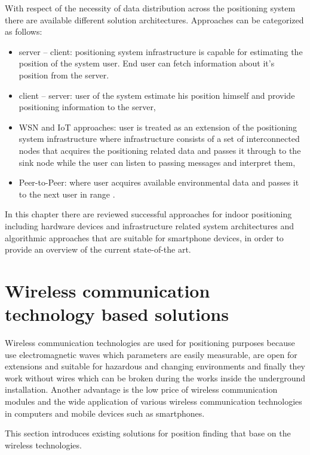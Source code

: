 \documentclass[../main.tex]{subfiles}
\begin{document}
With respect of the necessity of data distribution across the positioning system there are available different solution architectures. Approaches can be categorized as follows:
\begin{itemize}
	\item server -- client: positioning system infrastructure is capable for estimating the position of the system user. End user can fetch information about it's position from the server.
	\item client -- server: user of the system estimate his position himself and provide positioning information to the server,
	\item WSN and IoT approaches: user is treated as an extension of the positioning system infrastructure where infrastructure consists of a set of interconnected nodes that acquires the positioning related data and passes it through to the sink node while the user can listen to passing messages and interpret them,
	\item Peer-to-Peer: where user acquires available environmental data and passes it to the next user in range \cite{article_p2p_network_tracking_rfid}.
\end{itemize}

In this chapter there are reviewed successful approaches for indoor positioning including hardware devices and infrastructure related system architectures and algorithmic approaches that are suitable for smartphone devices, in order to provide an overview of the current state-of-the art.

\section{Wireless communication technology based solutions}
\label{sec:wireless_comm_tech_solutions}

Wireless communication technologies are used for positioning purposes because use electromagnetic waves which parameters are easily measurable, are open for extensions and suitable for hazardous and changing environments and finally they work without wires which can be broken during the works inside the underground installation. Another advantage is the low price of wireless communication modules and the wide application of various wireless communication technologies in computers and mobile devices such as smartphones.

This section introduces existing solutions for position finding that base on the wireless technologies.
\end{document}
